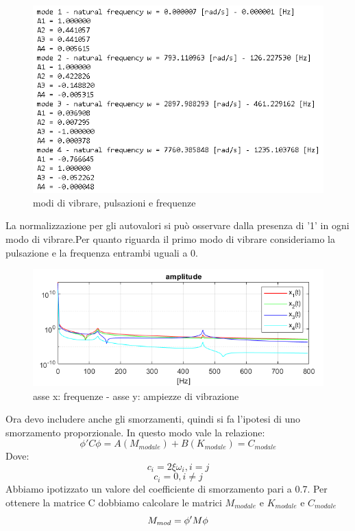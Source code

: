 \documentclass{article}
\begin{document}
\begin{figure}[H]
\centering
\includegraphics[width=.8\textwidth]{./assex/modi.png}
\caption{modi di vibrare, pulsazioni e frequenze}
\end{figure}
La normalizzazione per gli autovalori si può osservare dalla presenza di '1' in ogni modo di vibrare.Per quanto riguarda il primo modo di vibrare consideriamo la pulsazione e la frequenza entrambi uguali a 0.
\begin{figure}[H]
\centering
\includegraphics[width=.8\textwidth]{./assex/plot_c0.png}
\caption{ asse x: frequenze - asse y: ampiezze di vibrazione}
\end{figure}
Ora devo includere anche gli smorzamenti, quindi si fa l'ipotesi di uno smorzamento proporzionale. In questo modo vale la relazione:
\begin{equation*}
\phi' C \phi = A(M_{modale})+ B(K_{modale})= C_{modale}
\end{equation*}
Dove:
\begin{equation*}
c_i=2\xi \omega_i , i=j
\end{equation*}
\begin{equation*}
c_i=0 , i\neq j
\end{equation*}
Abbiamo ipotizzato un valore del coefficiente di smorzamento pari a 0.7. Per ottenere la matrice C dobbiamo calcolare le matrici $M_{modale}$ e $K_{modale}$ e $C_{modale}$
\begin{equation*}
\centering
    M_{mod} = \phi' M \phi
\end{equation*}
\end{document}
